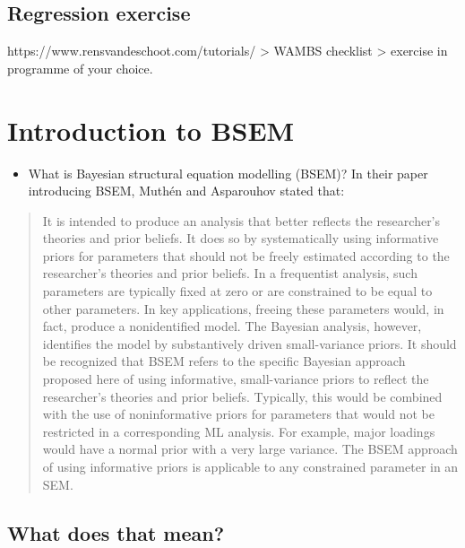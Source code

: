 \documentclass[
  a4paper,
  DIV=11,
  numbers=noendperiod]{scrreprt}
\providecommand{\tightlist}{%
  \setlength{\itemsep}{0pt}\setlength{\parskip}{0pt}}\usepackage{longtable,booktabs,array}
\begin{document}
\section{Regression exercise}\label{regression-exercise}

https://www.rensvandeschoot.com/tutorials/ \textgreater{} WAMBS
checklist \textgreater{} exercise in programme of your choice.


\chapter{Introduction to BSEM}\label{introduction-to-bsem}

\begin{itemize}
\tightlist
\item
  What is Bayesian structural equation modelling (BSEM)? In their paper
  introducing BSEM, Muthén and Asparouhov \citeyearpar[p
  316]{Muthen2012} stated that:
\end{itemize}

\begin{quote}
It is intended to produce an analysis that better reflects the
researcher's theories and prior beliefs. It does so by systematically
using informative priors for parameters that should not be freely
estimated according to the researcher's theories and prior beliefs. In a
frequentist analysis, such parameters are typically fixed at zero or are
constrained to be equal to other parameters. In key applications,
freeing these parameters would, in fact, produce a nonidentified model.
The Bayesian analysis, however, identifies the model by substantively
driven small-variance priors. It should be recognized that BSEM refers
to the specific Bayesian approach proposed here of using informative,
small-variance priors to reflect the researcher's theories and prior
beliefs. Typically, this would be combined with the use of
noninformative priors for parameters that would not be restricted in a
corresponding ML analysis. For example, major loadings would have a
normal prior with a very large variance. The BSEM approach of using
informative priors is applicable to any constrained parameter in an SEM.
\end{quote}

\section{What does that mean?}\label{what-does-that-mean}
\end{document}
